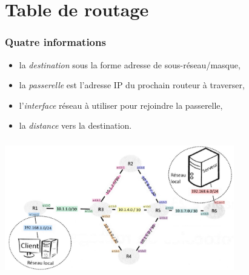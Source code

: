 \documentclass[svgnames,11pt]{beamer}
\begin{document}
\section{Table de routage}
\begin{frame}
    \frametitle{Quatre informations}

    \begin{itemize}
        \item la \emph{destination} sous la forme adresse de sous-réseau/masque,
        \item la \emph{passerelle} est l'adresse IP du prochain routeur à traverser,
        \item l'\emph{interface} réseau à utiliser pour rejoindre la passerelle,
        \item la \emph{distance} vers la destination.
    \end{itemize}

\end{frame}

\begin{frame}
    \frametitle{}

    \begin{center}
        \centering
        \includegraphics[width=10cm]{ressources/reseau.png}
        \label{reseau}
    \end{center}

\end{frame}
\end{document}

